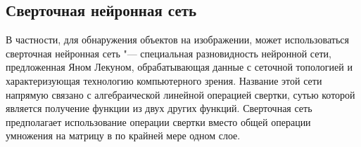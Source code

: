 \documentclass[bachelor, och, coursework]{SCWorks}
\begin{document}

    \subsection{Сверточная нейронная сеть}

        В частности, для обнаружения объектов на изображении, может использоваться сверточная нейронная сеть "--- специальная разновидность нейронной сети, предложенная Яном Лекуном, обрабатывающая данные с сеточной топологией и характеризующая технологию компьютерного зрения. Название этой сети напрямую связано с алгебраической линейной операцией свертки, сутью которой является получение функции из двух других функций. Сверточная сеть предполагает использование операции свертки вместо общей операции умножения на матрицу в по крайней мере одном слое.
\end{document}
